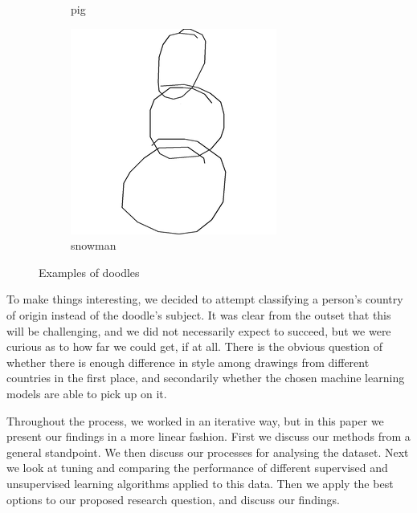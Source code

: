 \documentclass[a4paper, twocolumn]{article}
\begin{document}
\begin{figure}[H]
\begin{subfigure}{.33\columnwidth}
        \caption{pig}
        \label{fig:doodle2}
    \end{subfigure}%
    \begin{subfigure}{.33\columnwidth}
        \centering
        \includegraphics[width=.9\textwidth]{figures/doodle3.png}
        \caption{snowman}
        \label{fig:doodle3}
    \end{subfigure}
    \caption{Examples of doodles}
    \label{fig:doodles}
    \end{figure}

To make things interesting, we decided to attempt classifying a person's country of origin instead of the doodle's subject. It was clear from the outset that this will be challenging, and we did not necessarily expect to succeed, but we were curious as to how far we could get, if at all. There is the obvious question of whether there is enough difference in style among drawings from different countries in the first place, and secondarily whether the chosen machine learning models are able to pick up on it.

Throughout the process, we worked in an iterative way, but in this paper we present our findings in a more linear fashion. First we discuss our methods from a general standpoint. We then discuss our processes for analysing the dataset. Next we look at tuning and comparing the performance of different supervised and unsupervised learning algorithms applied to this data. Then we apply the best options to our proposed research question, and discuss our findings.
\end{document}
